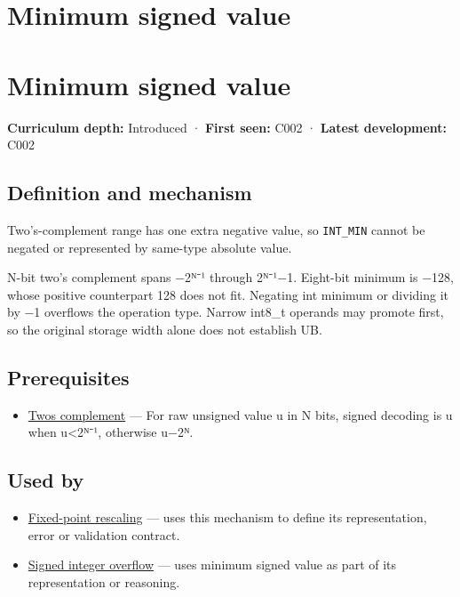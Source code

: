 \hypertarget{appendix-05f39b10364d}{}
\section*{Minimum signed value}
\section{Minimum signed value}\label{appendix-05f39b10364d-minimum-signed-value}

\textbf{Curriculum depth:} Introduced · \textbf{First seen:} C002 · \textbf{Latest development:} C002

\subsection{Definition and mechanism}\label{appendix-05f39b10364d-definition-and-mechanism}

Two's-complement range has one extra negative value, so \texttt{INT\_MIN} cannot be negated or represented by same-type absolute value.

N-bit two's complement spans −2ᴺ⁻¹ through 2ᴺ⁻¹−1. Eight-bit minimum is −128, whose positive counterpart 128 does not fit. Negating int minimum or dividing it by −1 overflows the operation type. Narrow int8\_t operands may promote first, so the original storage width alone does not establish UB.

\subsection{Prerequisites}\label{appendix-05f39b10364d-prerequisites}

\begin{itemize}
\tightlist
\item
  \hyperref[appendix-4fbc03d20829]{Two\textquotesingle s complement} --- For raw unsigned value u in N bits, signed decoding is u when u\textless2ᴺ⁻¹, otherwise u−2ᴺ.
\end{itemize}

\subsection{Used by}\label{appendix-05f39b10364d-used-by}

\begin{itemize}
\item
  \hyperref[appendix-3333db47830f]{Fixed-point rescaling} --- uses this mechanism to define its representation, error or validation contract.
\item
  \hyperref[appendix-1a599c924a4e]{Signed integer overflow} --- uses minimum signed value as part of its representation or reasoning.
\end{itemize}


